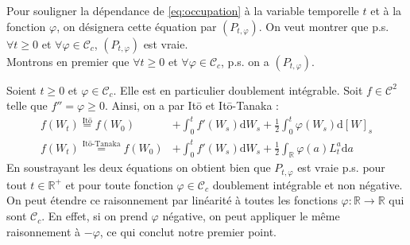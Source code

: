 \documentclass[openany]{book}
\makeatletter
\newcommand{\R}{\mathbb{R}}
\newcommand{\1}{\mathbbm{1}}
\newcommand{\refocc}{\hyperref[eq:occupation]{$(P_{t,\varphi})$}}
\renewcommand{\d}{\mathrm{d}}
\renewenvironment{proof}[1][\textbf{\textit{Démonstration}}]{%
  \par\pushQED{\qed}%
  \normalfont\topsep6\p@\@plus6\p@\relax
  \trivlist\item[\hskip\labelsep
    #1\@addpunct{.}]\ignorespaces
}{%
  \popQED\endtrivlist\@endpefalse
}
\theoremstyle{thmfont}
\theoremstyle{deffont}
\theoremstyle{thmfont}
\theoremstyle{deffont}
\makeatother
\begin{document}
\begin{proof}
  Pour souligner la dépendance de \eqref{eq:occupation} à la variable temporelle $t$ et à la fonction $\varphi$, on désignera cette équation par \refocc. On veut montrer que p.s. $\forall t\geq0$ et $\forall \varphi \in \mathcal C_c$, \refocc\; est vraie.\\

  Montrons en premier que $\forall t\geq 0$ et $\forall \varphi \in \mathcal C_c$, p.s. on a $(P_{t,\varphi}).$
  
  \noindent Soient $t\geq 0$ et $\varphi \in \mathcal C_c$. Elle est en particulier doublement intégrable. Soit $f \in \mathcal C^2$ telle que $f'' = \varphi \geq 0$.
  Ainsi, on a par Itō et Itō-Tanaka :
    \begin{align}
      f(W_t) \overset{\text{Itō}}{=} f(W_0) &+ \int_0^t f'(W_s) \d W_s + \frac{1}{2} \int_0^t \varphi(W_s) \d [W]_s \label{eq:proofFormOcc1}\\
      f(W_t) \overset{\text{Itō-Tanaka}}{=} f(W_0) &+ \int_0^t f'(W_s) \d W_s + \frac{1}{2}\int_\R \varphi(a) L_t^a\d a  \label{eq:proofFormOcc1}
    \end{align}
    En soustrayant les deux équations on obtient bien que $P_{t,\varphi}$ est vraie p.s. pour tout $t\in \R^+$ et pour toute fonction $\varphi\in \mathcal C_c$ doublement intégrable et non négative. On peut étendre ce raisonnement par linéarité à toutes les fonctions $\varphi : \R \rightarrow \R$ qui sont $\mathcal C_c$. En effet, si on prend $\varphi$ négative, on peut appliquer le même raisonnement à $-\varphi$, ce qui conclut notre premier point.\\


\end{proof}
\end{document}
